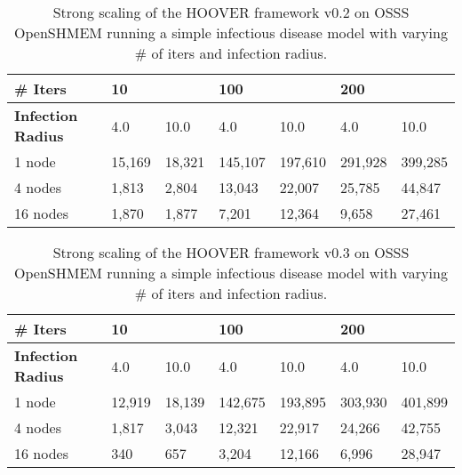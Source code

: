 \begin{table}
\centering
\begin{tabularx}{\textwidth}{ | l || X | X | X | X | X | X | }
\hline
\textbf{\# Iters}           & \multicolumn{2}{|X|}{\textbf{10}} & \multicolumn{2}{|X|}{\textbf{100}} & \multicolumn{2}{|X|}{\textbf{200}} \\\hline
\textbf{Infection Radius}   & 4.0          & 10.0         & 4.0           & 10.0          & 4.0           & 10.0 \\\hline
1 node                      & 15,169        & 18,321        & 145,107        & 197,610        & 291,928        & 399,285 \\\hline
4 nodes                     & 1,813         & 2,804         & 13,043         & 22,007         & 25,785         & 44,847 \\\hline
16 nodes                    & 1,870         & 1,877         & 7,201          &  12,364        & 9,658          & 27,461 \\\hline
\end{tabularx}
\caption{Strong scaling of the HOOVER framework v0.2 on OSSS OpenSHMEM running a
    simple infectious disease model with varying \# of iters and infection
    radius.}
\label{tab:strong_scaling2}
\end{table}

\begin{table}
\centering
\begin{tabularx}{\textwidth}{ | l || X | X | X | X | X | X | }
\hline
\textbf{\# Iters}           & \multicolumn{2}{|X|}{\textbf{10}} & \multicolumn{2}{|X|}{\textbf{100}} & \multicolumn{2}{|X|}{\textbf{200}} \\\hline
\textbf{Infection Radius}   & 4.0          & 10.0         & 4.0           & 10.0          & 4.0           & 10.0 \\\hline
1 node                      & 12,919 & 18,139 & 142,675 & 193,895 & 303,930 & 401,899 \\\hline
4 nodes                     &  1,817 &  3,043 &  12,321 &  22,917 &  24,266 &  42,755 \\\hline
16 nodes                    &   340 &   657 &   3,204 &  12,166 &   6,996 &  28,947 \\\hline
\end{tabularx}
\caption{Strong scaling of the HOOVER framework v0.3 on OSSS OpenSHMEM running a
    simple infectious disease model with varying \# of iters and infection
    radius.}
\label{tab:strong_scaling3}
\end{table}

